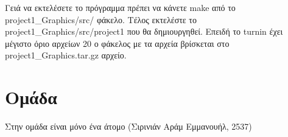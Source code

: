 \documentclass{article}
\begin{document}
Γειά να εκτελέσετε το πρόγραμμα πρέπει να κάνετε
make
από το
project1\_Graphics/src/
φάκελο. Τέλος εκτελέστε το
project1\_Graphics/src/project1
που θα δημιουργηθεί.
Επειδή το
turnin
έχει μέγιστο όριο αρχείων 20 ο φάκελος με τα αρχεία βρίσκεται στο
project1\_Graphics.tar.gz
 αρχείο.

\section{Ομάδα}

Στην ομάδα είναι μόνο ένα άτομο (Σιρινιάν Αράμ Εμμανουήλ, 2537)
\end{document}
